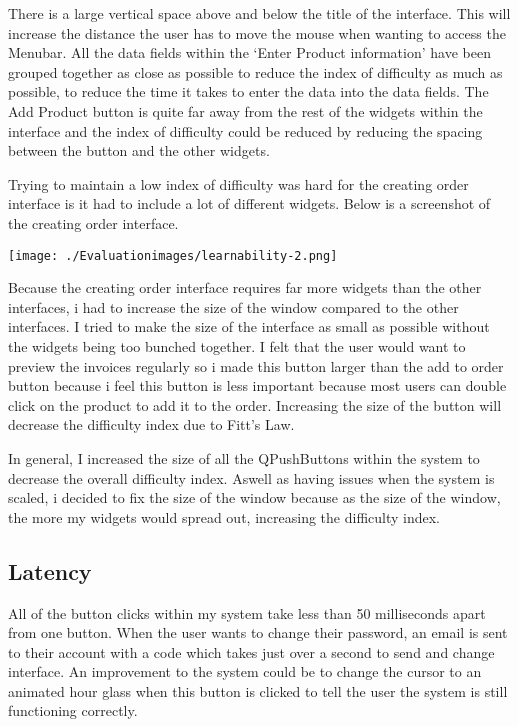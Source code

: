 There is a large vertical space above and below the title of the interface. This will increase the distance the user has to move the mouse when wanting to access the Menubar. All the data fields within the `Enter Product information' have been grouped together as close as possible to reduce the index of difficulty as much as possible, to reduce the time it takes to enter the data into the data fields. The Add Product button is quite far away from the rest of the widgets within the interface and the index of difficulty could be reduced by reducing the spacing between the button and the other widgets.

Trying to maintain a low index of difficulty was hard for the creating order interface is it had to include a lot of different widgets. Below is a screenshot of the
creating order interface.

\texttt{[image: ./Evaluationimages/learnability-2.png]}

Because the creating order interface requires far more widgets than the other interfaces, i had to increase the size of the window compared to the other interfaces. I tried to make the size of the interface as small as possible without the widgets being too bunched together. I felt that the user would want to preview the invoices regularly so i made this button larger than the add to order button because i feel this button is less important because most users can double click on the product to add it to the order. Increasing the size of the button will decrease the difficulty index due to Fitt's Law.

In general, I increased the size of all the QPushButtons within the system to decrease the overall difficulty index. Aswell as having issues when the system is scaled, i decided to fix the size of the window because as the size of the window, the more my widgets would spread out, increasing the difficulty index.

\subsection{Latency}

All of the button clicks within my system take less than 50 milliseconds apart from one button. When the user wants to change their password, an email is sent to their account with a code which takes just over a second to send and change interface. An improvement to the system could be to change the cursor to an animated hour glass when this button is clicked to tell the user the system is still functioning correctly.

